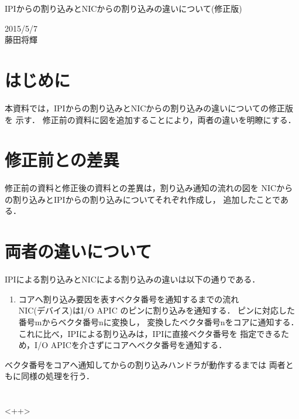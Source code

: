 \documentclass[12pt]{jsarticle}
\begin{document}

\begin{center}
{\LARGE IPIからの割り込みとNICからの割り込みの違いについて(修正版)}
\end{center}

\begin{flushright}
  2015/5/7\\
  藤田将輝
\end{flushright}
\section{はじめに}
本資料では，IPIからの割り込みとNICからの割り込みの違いについての修正版を
示す．
修正前の資料に図を追加することにより，両者の違いを明瞭にする．
\section{修正前との差異}
修正前の資料と修正後の資料との差異は，割り込み通知の流れの図を
NICからの割り込みとIPIからの割り込みについてそれぞれ作成し，
追加したことである．
\section{両者の違いについて}
IPIによる割り込みとNICによる割り込みの違いは以下の通りである．
\begin{enumerate}
    \item コアへ割り込み要因を表すベクタ番号を通知するまでの流れ\\
        NIC(デバイス)はI/O APIC のピンに割り込みを通知する．
        ピンに対応した番号mからベクタ番号nに変換し，
        変換したベクタ番号nをコアに通知する．
        これに比べ，IPIによる割り込みは，IPIに直接ベクタ番号を
        指定できるため，I/O APICを介さずにコアへベクタ番号を通知する．
\end{enumerate}
ベクタ番号をコアへ通知してからの割り込みハンドラが動作するまでは
両者ともに同様の処理を行う．
\section{}<++>
\end{document}
